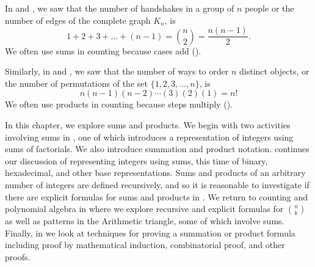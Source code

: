
In  and , we saw that the number of handshakes in a group of $n$ people or the number of edges of the complete graph $K_n$, is 
$$1 + 2 + 3 + \ldots + (n-1)  = \binom{n}{2} = \frac{n(n-1)}{2}.$$  
We often use sums in counting because cases add ().

Similarly, in  and , we saw that the number of ways to order $n$ distinct objects, or the number of permutations of the set $\{1, 2, 3, \ldots, n\}$, is
$$n(n-1)(n-2) \cdots(3)(2)(1)= n!$$
We often use products in counting because steps multiply ().

In this chapter, we explore sums and products. We begin with two activities involving sums in  {\secsumprod}, one of which introduces a representation of integers using sums of factorials.  We also introduce summation and product notation.  {\secbinhex} continues our discussion of representing integers using sums, this time of binary, hexadecimal, and other base representations. Sums and products of an arbitrary number of integers are defined recursively, and so it is reasonable to investigate if there are explicit formulas for sums and products in  {\secsumconj}.  We return to counting and polynomial algebra in  {\secarithtriangle} where we explore recursive and explicit formulas for $\binom{n}{k}$ as well as patterns in the Arithmetic triangle, some of which involve sums.  Finally, in   {\secsumproofs} we look at techniques for proving a summation or product formula including proof by mathematical induction, combinatorial proof, and other proofs.